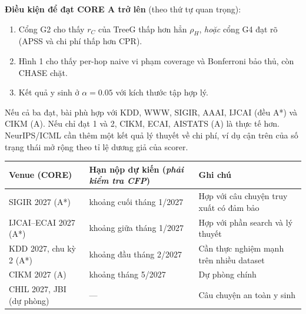 \documentclass[11pt,a4paper]{article}
\theoremstyle{remark}
\newcommand{\method}{\textsc{CHASE}}
\begin{document}
\textbf{Điều kiện để đạt CORE A trở lên} (theo thứ tự quan trọng):
\begin{enumerate}[nosep]
  \item Cổng G2 cho thấy $r_C$ của TreeG thấp hơn hẳn $\rho_H$, \emph{hoặc} cổng G4 đạt rõ (APSS và chi phí thấp hơn CPR).
  \item Hình 1 cho thấy per-hop naive vi phạm coverage và Bonferroni bảo thủ, còn \method{} chặt.
  \item Kết quả y sinh ở $\alpha=0.05$ với kích thước tập hợp lý.
\end{enumerate}
Nếu cả ba đạt, bài phù hợp với KDD, WWW, SIGIR, AAAI, IJCAI (đều A*) và CIKM (A). Nếu chỉ đạt 1 và 2, CIKM, ECAI, AISTATS (A) là thực tế hơn. NeurIPS/ICML cần thêm một kết quả lý thuyết về chi phí, ví dụ cận trên của số trạng thái mở rộng theo tỉ lệ dương giả của scorer.

\begin{center}
\small
\begin{tabular}{lll}
\toprule
Venue (CORE) & Hạn nộp dự kiến (\emph{phải kiểm tra CFP}) & Ghi chú \\
\midrule
SIGIR 2027 (A*) & khoảng cuối tháng 1/2027 & Hợp với câu chuyện truy xuất có đảm bảo \\
IJCAI--ECAI 2027 (A*) & khoảng giữa tháng 1/2027 & Hợp với phần search và lý thuyết \\
KDD 2027, chu kỳ 2 (A*) & khoảng đầu tháng 2/2027 & Cần thực nghiệm mạnh trên nhiều dataset \\
CIKM 2027 (A) & khoảng tháng 5/2027 & Dự phòng chính \\
CHIL 2027, JBI (dự phòng) & --- & Câu chuyện an toàn y sinh \\
\bottomrule
\end{tabular}
\end{center}

\end{document}
